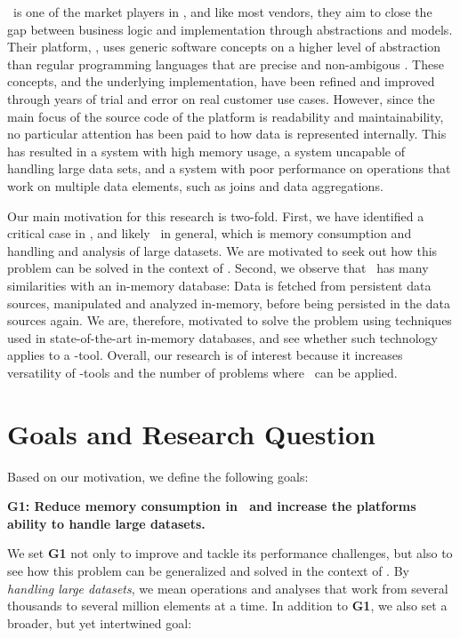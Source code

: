 \genus~is one of the market players in \mde, and like most vendors, they aim to close the gap between business logic and implementation through abstractions and models. Their platform, \gap, uses generic software concepts on a higher level of abstraction than regular programming languages that are precise and non-ambigous \cite{noauthor_undated-qy}. These concepts, and the underlying implementation, have been refined and improved through years of trial and error on real customer use cases. However, since the main focus of the source code of the platform is readability and maintainability, no particular attention has been paid to how data is represented internally. This has resulted in a system with high memory usage, a system uncapable of handling large data sets, and a system with poor performance on operations that work on multiple data elements, such as joins and data aggregations.

Our main motivation for this research is two-fold. First, we have identified a critical case in \gap, and likely \mde~in general, which is memory consumption and handling and analysis of large datasets. We are motivated to seek out how this problem can be solved in the context of \mdd. Second, we observe that \gap~has many similarities with an in-memory database: Data is fetched from persistent data sources, manipulated and analyzed in-memory, before being persisted in the data sources again. We are, therefore, motivated to solve the problem using techniques used in state-of-the-art in-memory databases, and see whether such technology applies to a \mde-tool. Overall, our research is of interest because it increases versatility of \mdd-tools and the number of problems where \mde~can be applied.

\section{Goals and Research Question}
\label{sec:Goals and Research Question}
Based on our motivation, we define the following goals:

\setlength{\leftskip}{1cm}

\textbf{G1: Reduce memory consumption in \gap~and increase the platforms ability to handle large datasets.}

\setlength{\leftskip}{0pt}

We set \textbf{G1} not only to improve \gap and tackle its performance challenges, but also to see how this problem can be generalized and solved in the context of \mde. By \textit{handling large datasets}, we mean operations and analyses that work from several thousands to several million elements at a time. In addition to \textbf{G1}, we also set a broader, but yet intertwined goal:

